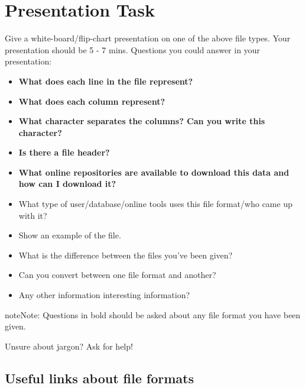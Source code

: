 \documentclass[a4paper,11pt,english]{sphinxmanual}
\begin{document}
\section{Presentation Task}
\label{exercises/known_file_formats:presentation-task}
Give a white-board/flip-chart presentation on one of the above file types. Your presentation should be 5 - 7 mins.
Questions you could answer in your presentation:
\begin{itemize}
\item {} 
\textbf{What does each line in the file represent?}

\item {} 
\textbf{What does each column represent?}

\item {} 
\textbf{What character separates the columns? Can you write this character?}

\item {} 
\textbf{Is there a file header?}

\item {} 
\textbf{What online repositories are available to download this data and how can I download it?}

\item {} 
What type of user/database/online tools uses this file format/who came up with it?

\item {} 
Show an example of the file.

\item {} 
What is the difference between the files you’ve been given?

\item {} 
Can you convert between one file format and another?

\item {} 
Any other information interesting information?

\end{itemize}

\begin{notice}{note}{Note:}
Questions in bold should be asked about any file format you have been given.
\end{notice}

Unsure about jargon? Ask for help!


\subsection{Useful links about file formats}
\label{exercises/known_file_formats:useful-links-about-file-formats}\label{exercises/known_file_formats:fileformats}
\end{document}
